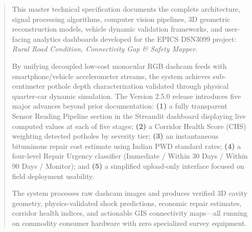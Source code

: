 \documentclass[11pt,a4paper]{report}
\begin{document}
\begin{abstract}
\noindent
This master technical specification documents the complete architecture, signal processing algorithms, computer vision pipelines, 3D geometric reconstruction models, vehicle dynamic validation frameworks, and user-facing analytics dashboards developed for the EPICS DSN3099 project: \textit{Rural Road Condition, Connectivity Gap \& Safety Mapper}.

By unifying decoupled low-cost monocular RGB dashcam feeds with smartphone/vehicle accelerometer streams, the system achieves sub-centimeter pothole depth characterization validated through physical quarter-car dynamic simulation. The Version 2.5.0 release introduces five major advances beyond prior documentation: \textbf{(1)} a fully transparent Sensor Reading Pipeline section in the Streamlit dashboard displaying live computed values at each of five stages; \textbf{(2)} a Corridor Health Score (CHS) weighting detected potholes by severity tier; \textbf{(3)} an instantaneous bituminous repair cost estimate using Indian PWD standard rates; \textbf{(4)} a four-level Repair Urgency classifier (Immediate / Within 30 Days / Within 90 Days / Monitor); and \textbf{(5)} a simplified upload-only interface focused on field deployment usability.

The system processes raw dashcam images and produces verified 3D cavity geometry, physics-validated shock predictions, economic repair estimates, corridor health indices, and actionable GIS connectivity maps---all running on commodity consumer hardware with zero specialized survey equipment.
\end{abstract}

\tableofcontents
\newpage









\end{document}
